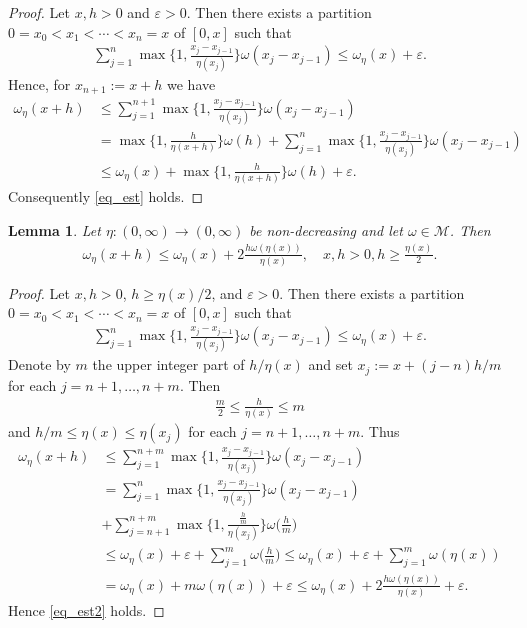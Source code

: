 \documentclass[10pt,a4paper]{amsart}
\newtheorem{lemma}[theorem]{Lemma}
\theoremstyle{definition}
\newcommand{\M}{\mathcal{M}}
\begin{document}
\begin{proof}
Let $ x,h>0 $ and $ \varepsilon>0 $. Then there exists a partition $ 0=x_0<x_1<\cdots<x_n=x $ of $ [0,x] $ such that
\begin{align*}
\sum_{j=1}^{n}\max\bigg\lbrace 1,\frac{x_j-x_{j-1}}{\eta(x_j)}\bigg\rbrace\omega(x_j-x_{j-1})\leq\omega_{\eta}(x)+\varepsilon.
\end{align*}
Hence, for $ x_{n+1}:=x+h $ we have
\begin{align*}
\omega_{\eta}(x+h)&\leq\sum_{j=1}^{n+1}\max\bigg\lbrace 1,\frac{x_j-x_{j-1}}{\eta(x_j)}\bigg\rbrace\omega(x_j-x_{j-1})\\
&=\max\bigg\lbrace 1,\frac{h}{\eta(x+h)}\bigg\rbrace\omega(h)+\sum_{j=1}^{n}\max\bigg\lbrace 1,\frac{x_j-x_{j-1}}{\eta(x_j)}\bigg\rbrace\omega(x_j-x_{j-1})\\
&\leq\omega_{\eta}(x)+\max\bigg\lbrace 1,\frac{h}{\eta(x+h)}\bigg\rbrace\omega(h)+\varepsilon.
\end{align*}
Consequently \eqref{eq_est} holds.
\end{proof}


\begin{lemma}\label{le_est2}
Let $ \eta:(0,\infty)\to(0,\infty) $ be non-decreasing and let $ \omega\in\M $. Then 
\begin{align}\label{eq_est2}
\omega_{\eta}(x+h)\leq\omega_{\eta}(x)+2\frac{h\omega(\eta(x))}{\eta(x)},\quad x,h>0,h\geq\frac{\eta(x)}{2}.
\end{align}
\end{lemma}

\begin{proof}
Let $ x,h>0 $, $ h\geq\eta(x)/2 $, and $ \varepsilon>0 $. Then there exists a partition $ 0=x_0<x_1<\cdots<x_n=x $ of $ [0,x] $ such that
\begin{align*}
\sum_{j=1}^{n}\max\bigg\lbrace 1,\frac{x_j-x_{j-1}}{\eta(x_j)}\bigg\rbrace\omega(x_j-x_{j-1})\leq\omega_{\eta}(x)+\varepsilon.
\end{align*}
Denote by $ m $ the upper integer part of $ h/\eta(x) $ and set $ x_j:=x+(j-n)h/m $ for each $ j=n+1,\dots,n+m $. Then
\begin{align*}
\frac{m}{2}\leq\frac{h}{\eta(x)}\leq m
\end{align*}
and $ h/m\leq\eta(x)\leq\eta(x_j) $ for each $ j=n+1,\dots,n+m $. Thus
\begin{align*}
\omega_{\eta}(x+h)&\leq\sum_{j=1}^{n+m}\max\bigg\lbrace 1,\frac{x_j-x_{j-1}}{\eta(x_j)}\bigg\rbrace\omega(x_j-x_{j-1})\\
&=\sum_{j=1}^{n}\max\bigg\lbrace 1,\frac{x_j-x_{j-1}}{\eta(x_j)}\bigg\rbrace\omega(x_j-x_{j-1})\\
&+\sum_{j=n+1}^{n+m}\max\bigg\lbrace 1,\frac{\frac{h}{m}}{\eta(x_j)}\bigg\rbrace\omega\bigg(\frac{h}{m}\bigg)\\
&\leq\omega_{\eta}(x)+\varepsilon+\sum_{j=1}^{m}\omega\bigg(\frac{h}{m}\bigg)\leq\omega_{\eta}(x)+\varepsilon+\sum_{j=1}^{m}\omega(\eta(x))\\
&=\omega_{\eta}(x)+m\omega(\eta(x))+\varepsilon\leq\omega_{\eta}(x)+2\frac{h\omega(\eta(x))}{\eta(x)}+\varepsilon.
\end{align*}
Hence \eqref{eq_est2} holds.
\end{proof}
\end{document}
